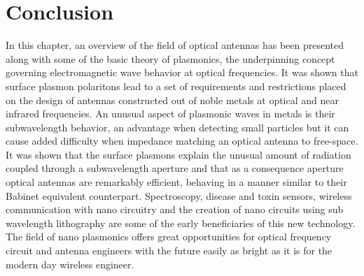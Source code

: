 \documentclass[11pt]{article}
\begin{document}
\section{Conclusion}
%
In this chapter, an overview of the field of optical antennas has been presented along with some of the basic theory of plasmonics, the underpinning concept governing electromagnetic wave behavior at optical frequencies. It was shown that surface plasmon polaritons lead to a set of requirements and restrictions placed on the design of antennas constructed out of noble metals at optical and near infrared frequencies. An unusual aspect of plasmonic waves in metals is their subwavelength behavior, an advantage when detecting small particles but it can cause added difficulty when impedance matching an optical antenna to free-space. It was shown that the surface plasmons explain the unusual amount of radiation coupled through a subwavelength aperture and that as a consequence aperture optical antennas are remarkably efficient, behaving in a manner similar to their Babinet equivalent counterpart. Spectroscopy, disease and toxin sensors, wireless communication with nano circuitry and the creation of nano circuits using sub wavelength lithography are some of the early beneficiaries of this new technology. The field of nano plasmonics offers great opportunities for optical frequency circuit and antenna engineers with the future easily as bright as it is for the modern day wireless engineer.
%
\clearpage %
% 


\end{document}
